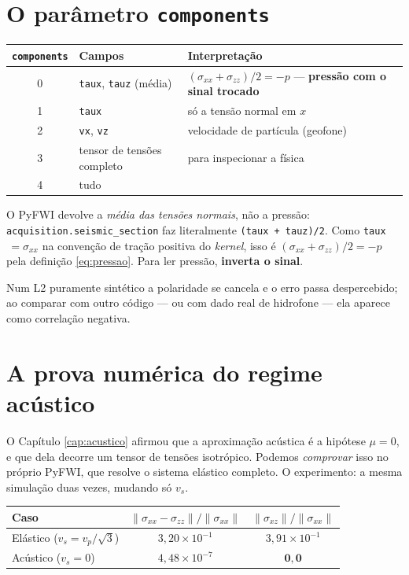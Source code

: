 \documentclass[11pt,a4paper,oneside]{report}
\begin{document}
\section{O parâmetro \texttt{components}}

\begin{center}
\begin{tabular}{@{}clp{7cm}@{}}
\toprule
\textbf{\texttt{components}} & \textbf{Campos} & \textbf{Interpretação} \\
\midrule
0 & \texttt{taux}, \texttt{tauz} (média) & $(\sigma_{xx}+\sigma_{zz})/2 = -p$ --- \textbf{pressão com o sinal trocado} \\
1 & \texttt{taux} & só a tensão normal em $x$ \\
2 & \texttt{vx}, \texttt{vz} & velocidade de partícula (geofone) \\
3 & tensor de tensões completo & para inspecionar a física \\
4 & tudo & \\
\bottomrule
\end{tabular}
\end{center}

\begin{armadilha}[O sinal de \texttt{components=0}]
O PyFWI devolve a \emph{média das tensões normais}, não a pressão:
\texttt{acquisition.seismic\_section} faz literalmente
\texttt{(taux + tauz)/2}. Como \texttt{taux}$\,=\sigma_{xx}$ na convenção de
tração positiva do \emph{kernel}, isso é $(\sigma_{xx}+\sigma_{zz})/2 = -p$
pela definição \eqref{eq:pressao}. Para ler pressão, \textbf{inverta o sinal}.

Num L2 puramente sintético a polaridade se cancela e o erro passa
despercebido; ao comparar com outro código --- ou com dado real de hidrofone
--- ela aparece como correlação negativa.
\end{armadilha}

\section{A prova numérica do regime acústico}

O Capítulo \ref{cap:acustico} afirmou que a aproximação acústica é a hipótese
$\mu = 0$, e que dela decorre um tensor de tensões isotrópico. Podemos
\emph{comprovar} isso no próprio PyFWI, que resolve o sistema elástico
completo. O experimento: a mesma simulação duas vezes, mudando só $v_s$.

\begin{center}
\begin{tabular}{@{}lcc@{}}
\toprule
\textbf{Caso} & $\|\sigma_{xx}-\sigma_{zz}\| / \|\sigma_{xx}\|$ & $\|\sigma_{xz}\| / \|\sigma_{xx}\|$ \\
\midrule
Elástico ($v_s = v_p/\sqrt{3}$) & $3{,}20\times10^{-1}$ & $3{,}91\times10^{-1}$ \\
Acústico ($v_s = 0$)            & $4{,}48\times10^{-7}$ & $\mathbf{0{,}0}$ \\
\bottomrule
\end{tabular}
\end{center}
\end{document}
